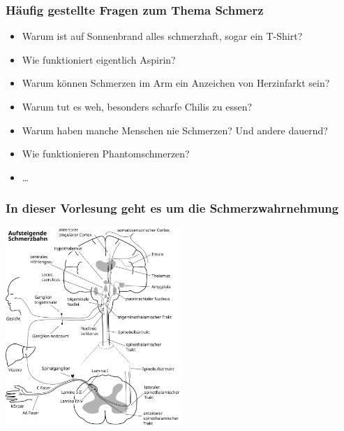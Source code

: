 \documentclass{beamer}
\begin{document}
\begin{frame}
\frametitle{Häufig gestellte Fragen zum Thema Schmerz}


\begin{itemize}
\item
Warum ist auf Sonnenbrand alles schmerzhaft, sogar ein T-Shirt?
\item
Wie funktioniert eigentlich Aspirin? 
\item
Warum können Schmerzen im Arm ein Anzeichen von Herzinfarkt sein? 
\item
Warum tut es weh, besonders scharfe Chilis zu essen?
\item
Warum haben manche Menschen nie Schmerzen? Und andere dauernd?
\item
Wie funktionieren Phantomschmerzen?  
\item
\dots 
\end{itemize}


\end{frame}





\begin{frame}
\frametitle{In dieser Vorlesung geht es um die Schmerzwahrnehmung}
\begin{center}
\includegraphics[width=0.5\textwidth]{Schmerz_aufsteigend.png}
\end{center}

\end{frame}



\end{document}
